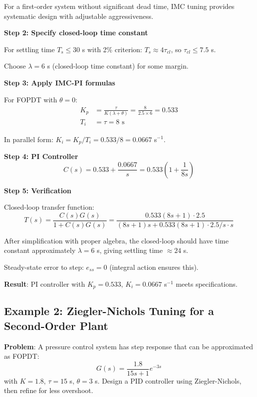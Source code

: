 For a first-order system without significant dead time, IMC tuning provides systematic design with adjustable aggressiveness.

\textbf{Step 2: Specify closed-loop time constant}

For settling time $T_s \leq 30$ s with 2\% criterion: $T_s \approx 4\tau_{cl}$, so $\tau_{cl} \leq 7.5$ s.

Choose $\lambda = 6$ s (closed-loop time constant) for some margin.

\textbf{Step 3: Apply IMC-PI formulas}

For FOPDT with $\theta = 0$:
\begin{align}
K_p &= \frac{\tau}{K(\lambda + \theta)} = \frac{8}{2.5 \times 6} = 0.533 \\
T_i &= \tau = 8 \text{ s}
\end{align}

In parallel form: $K_i = K_p/T_i = 0.533/8 = 0.0667$ s$^{-1}$.

\textbf{Step 4: PI Controller}
\begin{equation}
C(s) = 0.533 + \frac{0.0667}{s} = 0.533 \left(1 + \frac{1}{8s}\right)
\end{equation}

\textbf{Step 5: Verification}

Closed-loop transfer function:
\begin{equation}
T(s) = \frac{C(s)G(s)}{1 + C(s)G(s)} = \frac{0.533(8s+1) \cdot 2.5}{(8s+1)s + 0.533(8s+1) \cdot 2.5/s \cdot s}
\end{equation}

After simplification with proper algebra, the closed-loop should have time constant approximately $\lambda = 6$ s, giving settling time $\approx 24$ s.

Steady-state error to step: $e_{ss} = 0$ (integral action ensures this).

\textbf{Result}: PI controller with $K_p = 0.533$, $K_i = 0.0667$ s$^{-1}$ meets specifications.

\subsection{Example 2: Ziegler-Nichols Tuning for a Second-Order Plant}
\label{subsec:ex_zn_second_order}

\textbf{Problem}: A pressure control system has step response that can be approximated as FOPDT:
\begin{equation}
G(s) = \frac{1.8}{15s + 1} e^{-3s}
\end{equation}
with $K = 1.8$, $\tau = 15$ s, $\theta = 3$ s. Design a PID controller using Ziegler-Nichols, then refine for less overshoot.

